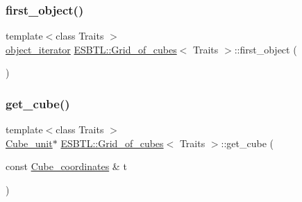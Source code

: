 \mbox{\label{structESBTL_1_1Grid__of__cubes_aadc2357c0255f0dc412d754755f8b3a9}} 
\subsubsection{\texorpdfstring{first\+\_\+object()}{first\_object()}}
{\footnotesize\ttfamily template$<$class Traits $>$ \\
\hyperlink{classESBTL_1_1Grid__of__cubes_1_1object__iterator}{object\+\_\+iterator} \hyperlink{structESBTL_1_1Grid__of__cubes}{E\+S\+B\+T\+L\+::\+Grid\+\_\+of\+\_\+cubes}$<$ Traits $>$\+::first\+\_\+object (\begin{DoxyParamCaption}{ }\end{DoxyParamCaption})\hspace{0.3cm}{\ttfamily [inline]}}

\mbox{\label{structESBTL_1_1Grid__of__cubes_a9a2e0688f74121896de5feeebc13903b}} 
\subsubsection{\texorpdfstring{get\+\_\+cube()}{get\_cube()}\hspace{0.1cm}{\footnotesize\ttfamily [1/2]}}
{\footnotesize\ttfamily template$<$class Traits $>$ \\
\hyperlink{structESBTL_1_1Grid__of__cubes_1_1Cube__unit}{Cube\+\_\+unit}$\ast$ \hyperlink{structESBTL_1_1Grid__of__cubes}{E\+S\+B\+T\+L\+::\+Grid\+\_\+of\+\_\+cubes}$<$ Traits $>$\+::get\+\_\+cube (\begin{DoxyParamCaption}\item[{const \hyperlink{structESBTL_1_1Grid__of__cubes_ad55c84346bab961e08d95e494551d07d}{Cube\+\_\+coordinates} \&}]{t }\end{DoxyParamCaption})\hspace{0.3cm}{\ttfamily [inline]}}

